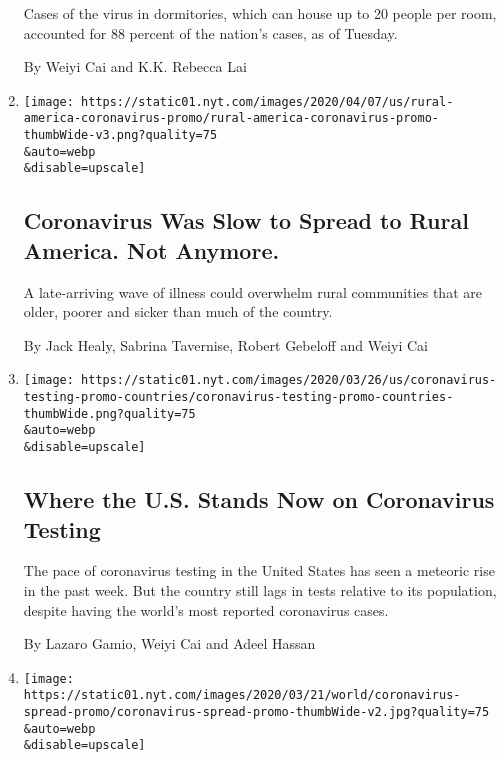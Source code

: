 \begin{enumerate}
  Cases of the virus in dormitories, which can house up to 20 people per
  room, accounted for 88 percent of the nation's cases, as of Tuesday.

  By Weiyi Cai and K.K. Rebecca Lai
\item
  \href{/interactive/2020/04/08/us/coronavirus-rural-america-cases.html}{}

  \texttt{[image: https://static01.nyt.com/images/2020/04/07/us/rural-america-coronavirus-promo/rural-america-coronavirus-promo-thumbWide-v3.png?quality=75\\\&auto=webp\\\&disable=upscale]}

  \hypertarget{coronavirus-was-slow-to-spread-to-rural-america-not-anymore}{%
  \subsection{Coronavirus Was Slow to Spread to Rural America. Not
  Anymore.}\label{coronavirus-was-slow-to-spread-to-rural-america-not-anymore}}

  A late-arriving wave of illness could overwhelm rural communities that
  are older, poorer and sicker than much of the country.

  By Jack Healy, Sabrina Tavernise, Robert Gebeloff and Weiyi Cai
\item
  \href{/interactive/2020/03/26/us/coronavirus-testing-states.html}{}

  \texttt{[image: https://static01.nyt.com/images/2020/03/26/us/coronavirus-testing-promo-countries/coronavirus-testing-promo-countries-thumbWide.png?quality=75\\\&auto=webp\\\&disable=upscale]}

  \hypertarget{where-the-us-stands-now-on-coronavirus-testing}{%
  \subsection{Where the U.S. Stands Now on Coronavirus
  Testing}\label{where-the-us-stands-now-on-coronavirus-testing}}

  The pace of coronavirus testing in the United States has seen a
  meteoric rise in the past week. But the country still lags in tests
  relative to its population, despite having the world's most reported
  coronavirus cases.

  By Lazaro Gamio, Weiyi Cai and Adeel Hassan
\item
  \href{/interactive/2020/03/22/world/coronavirus-spread.html}{}

  \texttt{[image: https://static01.nyt.com/images/2020/03/21/world/coronavirus-spread-promo/coronavirus-spread-promo-thumbWide-v2.jpg?quality=75\\\&auto=webp\\\&disable=upscale]}


\end{enumerate}
